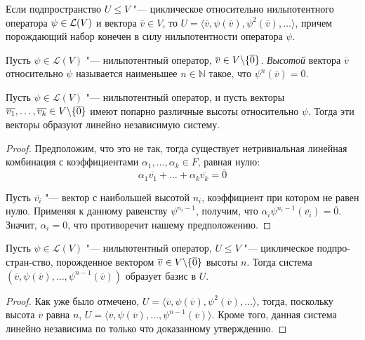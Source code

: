 \begin{note}
	Если подпространство $U \le V$ "--- циклическое относительно нильпотентного оператора $\psi \in \mathcal L(V)$ и вектора $\overline{v} \in V$, то $U = \langle\overline{v}, \psi(\overline{v}), \psi^2(\overline{v}), \dots\rangle$, причем порождающий набор конечен в силу нильпотентности оператора $\psi$.
\end{note}

\begin{definition}
	Пусть $\psi \in \mathcal{L}(V)$ "--- нильпотентный оператор, $\overline{v} \in V \backslash \{\overline 0\}$. \textit{Высотой} вектора $\overline{v}$ относительно $\psi$ называется наименьшее $n \in \mathbb{N}$ такое, что $\psi^n(\overline{v}) = \overline{0}$.
\end{definition}

\begin{proposition}
	Пусть $\psi \in \mathcal{L}(V)$ "--- нильпотентный оператор, и пусть векторы ${\overline{v_1}, \dots, \overline{v_k} \in V \backslash \{\overline 0\}}$ имеют попарно различные высоты относительно $\psi$. Тогда эти векторы образуют линейно независимую систему.
\end{proposition}

\begin{proof}
	Предположим, что это не так, тогда существует нетривиальная линейная комбинация с коэффициентами $\alpha_1, \dotsc, \alpha_k \in F$, равная нулю:
	\[\alpha_1\overline{v_1} + \dots + \alpha_k\overline{v_k} = \overline{0}\]
	
	Пусть $\overline{v_i}$ "--- вектор с наибольшей высотой $n_i$, коэффициент при котором не равен нулю. Применяя к данному равенству $\psi^{n_i - 1}$, получим, что $\alpha_i\psi^{n_i-1}(\overline{v_i}) = \overline{0}$. Значит, $\alpha_i = 0$, что противоречит нашему предположению.
\end{proof}

\begin{corollary}
	Пусть $\psi \in \mathcal{L}(V)$ "--- нильпотентный оператор, $U \le V$ "--- циклическое подпро-    ст\-ран-ство, порожденное вектором $\overline{v} \in V \backslash \{\overline 0\}$ высоты $n$. Тогда {система $(\overline{v}, \psi(\overline{v}), \dots, \psi^{n-1}(\overline{v}))$} образует базис в $U$.
\end{corollary}

\begin{proof}
	Как уже было отмечено, $U = \langle\overline{v}, \psi(\overline{v}), \psi^2(\overline{v}), \dots\rangle$, тогда, поскольку высота $\overline{v}$ равна $n$, $U = \langle\overline{v}, \psi(\overline{v}), \dots, \psi^{n - 1}(\overline{v})\rangle$. Кроме того, данная система линейно независима по только что доказанному утверждению.
\end{proof}

